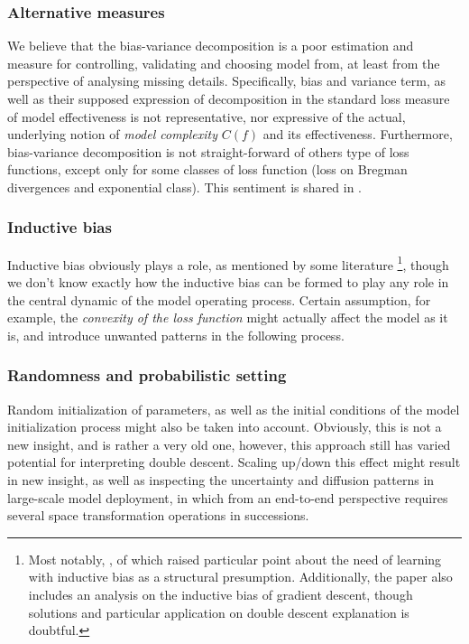 \documentclass[10pt]{article} %
\begin{document}
\subsubsection{Alternative measures}
We believe that the bias-variance decomposition is a poor estimation and measure for controlling, validating and choosing model from, at least from the perspective of analysing missing details. Specifically, bias and variance term, as well as their supposed expression of decomposition in the standard loss measure of model effectiveness is not representative, nor expressive of the actual, underlying notion of \textit{model complexity} $C(f)$ and its effectiveness. Furthermore, bias-variance decomposition is not straight-forward of others type of loss functions, except only for some classes of loss function (loss on Bregman divergences and exponential class). This sentiment is shared in \cite{brown2024biasvariance}.

\subsubsection{Inductive bias}
Inductive bias obviously plays a role, as mentioned by some literature \footnote{Most notably, \cite{lafon_understanding_2024}, of which raised particular point about the need of learning with inductive bias as a structural presumption. Additionally, the paper also includes an analysis on the inductive bias of gradient descent, though solutions and particular application on double descent explanation is doubtful.}, though we don't know exactly how the inductive bias can be formed to play any role in the central dynamic of the model operating process. Certain assumption, for example, the \textit{convexity of the loss function} might actually affect the model as it is, and introduce unwanted patterns in the following process. 
\subsubsection{Randomness and probabilistic setting}
Random initialization of parameters, as well as the initial conditions of the model initialization process might also be taken into account. Obviously, this is not a new insight, and is rather a very old one, however, this approach still has varied potential for interpreting double descent. Scaling up/down this effect might result in new insight, as well as inspecting the uncertainty and diffusion patterns in large-scale model deployment, in which from an end-to-end perspective requires several space transformation operations in successions.
\end{document}
